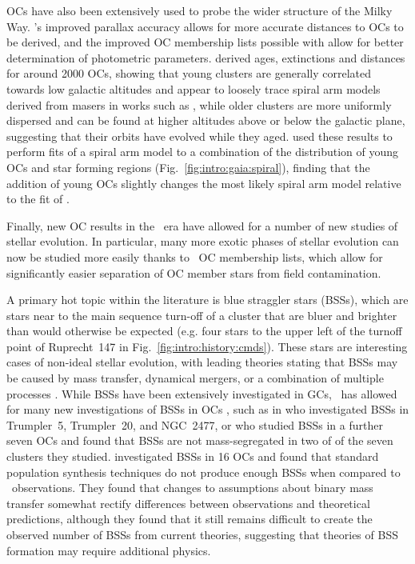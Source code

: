 OCs have also been extensively used to probe the wider structure of the Milky Way. \gaia's improved parallax accuracy allows for more accurate distances to OCs to be derived, and the improved OC membership lists possible with \gaia allow for better determination of photometric parameters. \cite{cantat-gaudin_painting_2020} derived ages, extinctions and distances for around 2000 OCs, showing that young clusters are generally correlated towards low galactic altitudes and appear to loosely trace spiral arm models derived from masers in works such as \cite{reid_trigonometric_parallaxes_2014}, while older clusters are more uniformly dispersed and can be found at higher altitudes above or below the galactic plane, suggesting that their orbits have evolved while they aged. \cite{castro-ginard_milky_2021} used these results to perform fits of a spiral arm model to a combination of the distribution of young OCs and star forming regions (Fig.~\ref{fig:intro:gaia:spiral}), finding that the addition of young OCs slightly changes the most likely spiral arm model relative to the fit of \cite{reid_trigonometric_parallaxes_2014}.

Finally, new OC results in the \gaia\ era have allowed for a number of new studies of stellar evolution. In particular, many more exotic phases of stellar evolution can now be studied more easily thanks to \gaia\ OC membership lists, which allow for significantly easier separation of OC member stars from field contamination. 

A primary hot topic within the literature is blue straggler stars (BSSs), which are stars near to the main sequence turn-off of a cluster that are bluer and brighter than would otherwise be expected (e.g. four stars to the upper left of the turnoff point of Ruprecht~147 in Fig.~\ref{fig:intro:history:cmds}). These stars are interesting cases of non-ideal stellar evolution, with leading theories stating that BSSs may be caused by mass transfer, dynamical mergers, or a combination of multiple processes \citep{boffin_ecology_2015}. While BSSs have been extensively investigated in GCs, \gaia\ has allowed for many new investigations of BSSs in OCs \citep{cantat-gaudin_milky_2022}, such as in \cite{rain_blue_2020} who investigated BSSs in Trumpler~5, Trumpler~20, and NGC~2477, or \cite{vaidya_blue_2020} who studied BSSs in a further seven OCs and found that BSSs are not mass-segregated in two of of the seven clusters they studied. \cite{leiner_census_blue_2021} investigated BSSs in 16 OCs and found that standard population synthesis techniques do not produce enough BSSs when compared to \gaia\ observations. They found that changes to assumptions about binary mass transfer somewhat rectify differences between observations and theoretical predictions, although they found that it still remains difficult to create the observed number of BSSs from current theories, suggesting that theories of BSS formation may require additional physics.

